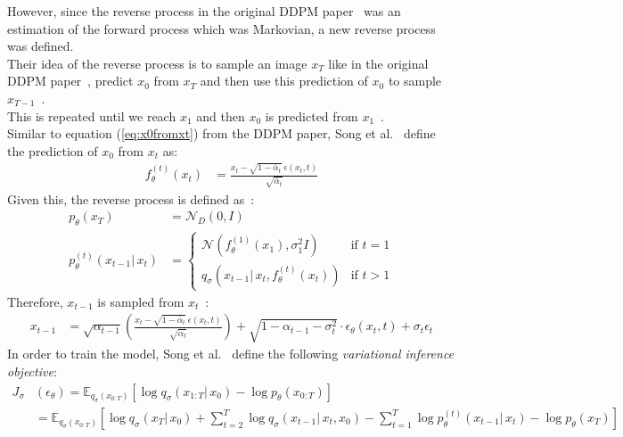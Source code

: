 \documentclass[twoside]{article}
\numberwithin{equation}{section}
\numberwithin{figure}{section}
\begin{document}
However, since the reverse process in the original DDPM paper~\cite{ho2020denoising} was an estimation of the forward process which was Markovian, a new reverse process was defined. \\
Their idea of the reverse process is to sample an image $x_T$ like in the original DDPM paper~\cite{ho2020denoising}, predict $x_0$ from $x_T$ and then use this prediction of $x_0$ to sample $x_{T-1}$~\cite{song2022denoising}. \\
This is repeated until we reach $x_1$ and then $x_0$ is predicted from $x_1$~\cite{song2022denoising}. \\
Similar to equation (\ref{eq:x0fromxt}) from the DDPM paper, Song et al.~\cite{song2022denoising} define the prediction of $x_0$ from $x_t$ as:
\begin{align}
  f_\theta^{(t)} (x_t) &= \frac{x_t - \sqrt{1 - \bar{\alpha}_t} \: \epsilon(x_t, t)}{\sqrt{\bar{\alpha}_t}}
\end{align}
Given this, the reverse process is defined as~\cite{song2022denoising}:
\begin{align}
  p_\theta (x_T) &= \mathcal{N}_D(0, I) \\
  p_\theta^{(t)} (x_{t-1} | \, x_t) &= \begin{cases}
    \mathcal{N}(f_\theta^{(1)}(x_{1}), \sigma_1^2 I) & \text{if } t = 1 \\
    q_\sigma(x_{t-1} | \, x_t, f_\theta^{(t)}(x_t)) & \text{if } t > 1
  \end{cases}
\end{align}
Therefore, $x_{t-1}$ is sampled from $x_t$~\cite{song2022denoising}: 
\begin{align}
  x_{t-1} &= \sqrt{\alpha_{t-1}} \left( \frac{x_t - \sqrt{1 - \bar{\alpha}_t} \: \epsilon(x_t, t)}{\sqrt{\bar{\alpha}_t}} \right) + \sqrt{1 - \alpha_{t-1} - \sigma_t^2} \cdot \epsilon_\theta (x_t, t) + \sigma_t \epsilon_t
\end{align}
In order to train the model, Song et al.~\cite{song2022denoising} define the following \textit{variational inference objective}:
\begin{align}
  J_\sigma & (\epsilon_\theta) = \mathbb{E}_{q_\sigma (x_{0:T})} \left[ \log q_\sigma (x_{1:T} | \, x_0) - \log p_\theta (x_{0:T}) \right] \\
  &= \mathbb{E}_{q_\sigma (x_{0:T})} \left[ \log q_\sigma (x_T | \, x_0) + \sum_{t=2}^{T} \log q_\sigma (x_{t-1} | \, x_t, x_0) - \sum_{t=1}^{T} \log p_\theta^{(t)} (x_{t-1} | \, x_t) - \log p_\theta (x_T) \right]
\end{align}
\end{document}
